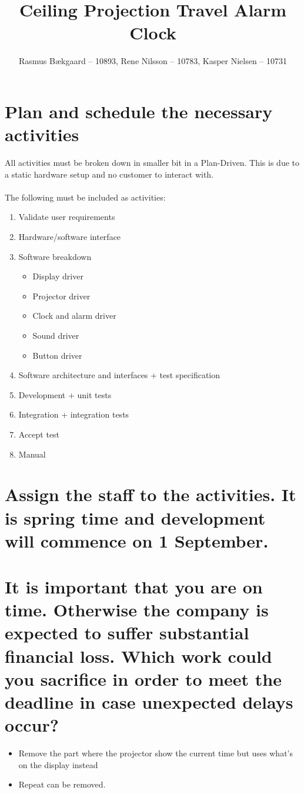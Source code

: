 \documentclass[10pt, a4]{article}
\title{Ceiling Projection Travel Alarm Clock}
\author{Rasmus Bækgaard -- 10893, Rene Nilsson -- 10783, Kasper Nielsen -- 10731}
\begin{document}
\maketitle


\section{Plan and schedule the necessary activities} 

All activities must be broken down in smaller bit in a Plan-Driven.
This is due to a static hardware setup and no customer to interact with.
\\
\\
The following must be included as activities:
\begin{enumerate}
	\item Validate user requirements
	\item Hardware/software interface
	\item Software breakdown
	\begin{itemize}
		\item Display driver
		\item Projector driver
		\item Clock and alarm driver
		\item Sound driver
		\item Button driver
	\end{itemize}
	\item Software architecture and interfaces + test specification
	\item Development + unit tests
	\item Integration + integration tests
	\item Accept test
	\item Manual
\end{enumerate}





\section{Assign the staff to the activities. It is spring time and development will commence on 1 September.}





\section{It is important that you are on time. 
	Otherwise the company is expected to suffer substantial financial loss. 
	Which work could you sacrifice in order to meet the deadline in case unexpected delays occur?}

\begin{itemize}
	\item Remove the part where the projector show the current time but uses what's on the display instead
	\item Repeat can be removed.
\end{itemize}
\end{document}
